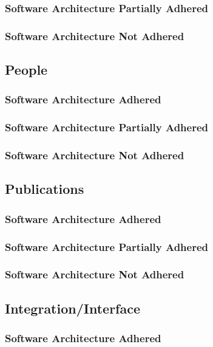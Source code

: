 \documentclass{article}
\begin{document}
        \subsubsection{Software Architecture Partially Adhered}
        \subsubsection{Software Architecture Not Adhered}       
        
    \subsection{People}
        \subsubsection{Software Architecture Adhered}
        \subsubsection{Software Architecture Partially Adhered}
        \subsubsection{Software Architecture Not Adhered}       
        
    \subsection{Publications}
        \subsubsection{Software Architecture Adhered}
        \subsubsection{Software Architecture Partially Adhered}
        \subsubsection{Software Architecture Not Adhered}       
        
    \subsection{Integration/Interface}
        \subsubsection{Software Architecture Adhered}
\end{document}
